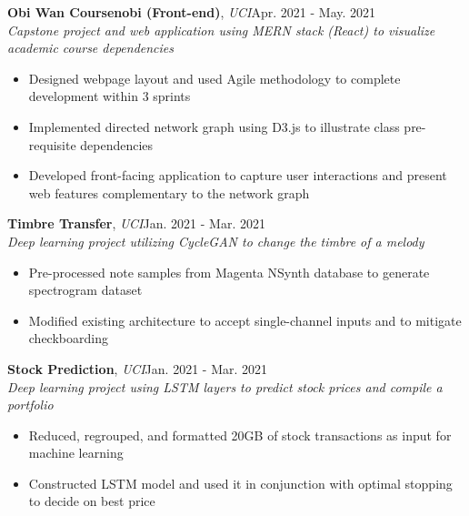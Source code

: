 \documentclass[12pt]{article}
\newcommand\firstboxx[2]{\textbf{\fontsize{12.8}{15}\selectfont #1}, \textit{#2}}
\newcommand{\itemheader}[3]{\firstboxx{#1}{#2}\hfill#3}
\begin{document}
\bigskip
\itemheader{Obi Wan Coursenobi (Front-end)}{UCI}{Apr. 2021 - May. 2021}
\\ \textit{Capstone project and web application using MERN stack (React) to visualize academic course dependencies}
\begin{itemize}
\item Designed webpage layout and used Agile methodology to complete development within 3 sprints
\item Implemented directed network graph using D3.js to illustrate class pre-requisite dependencies
\item Developed front-facing application to capture user interactions and present web features complementary to the network graph
\end{itemize}

\bigskip
\itemheader{Timbre Transfer}{UCI}{Jan. 2021 - Mar. 2021}
\\ \textit{Deep learning project utilizing CycleGAN to change the timbre of a melody}
\begin{itemize}
\item Pre-processed note samples from Magenta NSynth database to generate spectrogram dataset
\item Modified existing architecture to accept single-channel inputs and to mitigate checkboarding
\end{itemize}

\bigskip
\itemheader{Stock Prediction}{UCI}{Jan. 2021 - Mar. 2021}
\\ \textit{Deep learning project using LSTM layers to predict stock prices and compile a portfolio}
\begin{itemize}
\item Reduced, regrouped, and formatted 20GB of stock transactions as input for machine learning
\item Constructed LSTM model and used it in conjunction with optimal stopping to decide on best price
\end{itemize}

\end{document}
